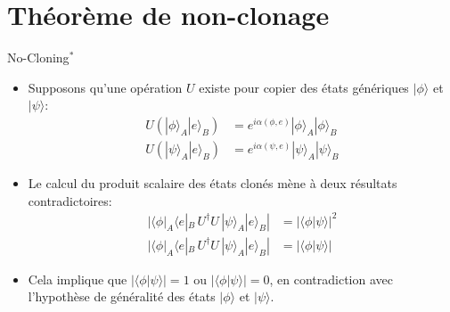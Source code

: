 \documentclass[aspectratio=169,12pt]{beamer}
\begin{document}
\section{Théorème de non-clonage}

\begin{frame}{No-Cloning$^*$}
    \begin{itemize}
        \item Supposons qu'une opération $U$ existe pour copier des états génériques $|\phi \rangle$ et $|\psi \rangle$:
        \begin{align*}
            U(|\phi \rangle _{A}|e\rangle _{B}) &= e^{i\alpha (\phi ,e)}|\phi \rangle _{A}|\phi \rangle _{B} \\
            U(|\psi \rangle _{A}|e\rangle _{B}) &= e^{i\alpha (\psi ,e)}|\psi \rangle _{A}|\psi \rangle _{B}
        \end{align*}
        \item Le calcul du produit scalaire des états clonés mène à deux résultats contradictoires:
        \begin{align*}
            | \langle \phi|_{A}\langle e|_{B} \, U^\dagger U \, |\psi \rangle _{A}|e\rangle _{B} | &= | \langle \phi |\psi \rangle |^{2} \\
            | \langle \phi|_{A}\langle e|_{B} \, U^\dagger U \, |\psi \rangle _{A}|e\rangle _{B} | &= | \langle \phi |\psi \rangle |
        \end{align*}
        \item Cela implique que $|\langle \phi |\psi \rangle |=1$ ou $|\langle \phi |\psi \rangle |=0$, en contradiction avec l'hypothèse de généralité des états $|\phi \rangle$ et $|\psi \rangle$.
    \end{itemize}
\end{frame}
\end{document}
